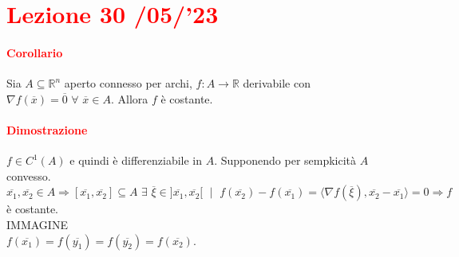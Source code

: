 \documentclass{article}
\newcommand{\R}{\mathbb{R}}
\begin{document}
\newpage
\section{\textcolor{red}{Lezione 30 \space{}/05/'23}}

\paragraph{\textcolor{red}{Corollario}}
Sia $A \subseteq \R^n$ aperto connesso per archi, $f:A \rightarrow \R$ derivabile con $\nabla f(\overline{x})=\overline{0}\,\, \forall \,\, \overline{x} \in A$. Allora $f$ è costante. 

\paragraph{\textcolor{red}{Dimostrazione}}
$f \in C^1(A)$ e quindi è differenziabile in $A$. Supponendo per sempkicità $A$ convesso. $\overline{x_1},\overline{x_2}\in A\Rightarrow [\overline{x_1},\overline{x_2}]\subseteq A \,\,\exists \,\, \overline{\xi}\in ]\overline{x_1},\overline{x_2}[\,\,\mid\,\, f(\overline{x_2})-f(\overline{x_1})=\langle\nabla f(\overline{\xi}),\overline{x_2}-\overline{x_1}\rangle =0 \Rightarrow f$ è costante.\\
IMMAGINE\\
$f(\overline{x_1})=f(\overline{y_1})=f(\overline{y_2})=f(\overline{x_2})$.
\begin{flushright}
    \Lightning
\end{flushright}
\end{document}
